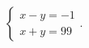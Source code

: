 $\displaystyle
\left\{
\begin{array}{l}
\displaystyle x - y = -1 \\
\displaystyle x + y = 99 
\end{array}
\right.
$.
